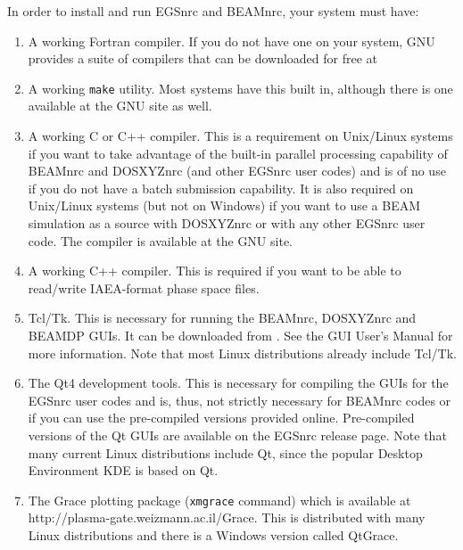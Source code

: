 \documentclass[12pt,twoside]{article}
\begin{document}
In order to install and run EGSnrc and BEAMnrc, your system must have:
\begin{enumerate}
\item A working Fortran compiler.  If you do not have one on
your system, GNU provides a suite of compilers that can be downloaded
for free at 
\item A working {\tt make} utility.  Most systems have this built in, although
there is one available at the GNU site as well.
\item A working C or C++ compiler.  This is a requirement on Unix/Linux
systems if you want to take advantage of
the built-in parallel processing capability of BEAMnrc and DOSXYZnrc
(and other EGSnrc user codes) and is of no use if you do not
have a batch submission capability.  It is also required on Unix/Linux
systems (but not on Windows) if you want to use a BEAM simulation as a
source with DOSXYZnrc or with any other EGSnrc user code.
The compiler is available at the GNU site.
\item A working C++ compiler.  This is required if you want to be
able to read/write IAEA-format phase space files.
\item Tcl/Tk.  This is necessary for running the BEAMnrc, DOSXYZnrc and
BEAMDP GUIs.  It can be downloaded from
.  See the GUI User's Manual\cite{Tr04} for
more information.  Note that most Linux distributions already include
Tcl/Tk.
\item The Qt4 development tools. This is necessary for
compiling the GUIs for the EGSnrc user codes and is, thus,
not strictly necessary for BEAMnrc codes or if you can use the
pre-compiled versions provided online. Pre-compiled versions of
the Qt GUIs are available on the EGSnrc release page.
Note that many current Linux distributions
include Qt, since the popular Desktop Environment KDE is based on Qt.

\item The Grace plotting package ({\tt xmgrace} command) which is available at\\
 {http://plasma-gate.weizmann.ac.il/Grace}. This is distributed with many
Linux distributions and there is a Windows version called QtGrace.
\end{enumerate}
\end{document}
